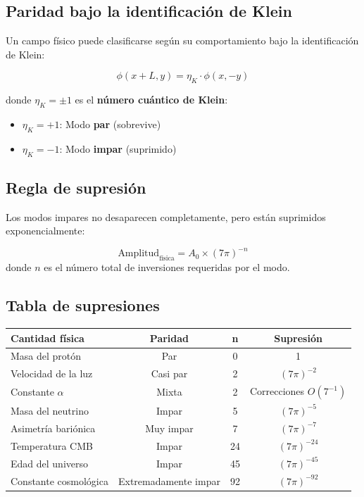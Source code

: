 \documentclass[12pt,a4paper,openany]{book}
\begin{document}
\begin{nivelconceptual}

\section*{Paridad bajo la identificación de Klein}

Un campo físico puede clasificarse según su comportamiento bajo la identificación de Klein:

\begin{equation}
    \phi(x + L, y) = \eta_K \cdot \phi(x, -y)
\end{equation}

donde $\eta_K = \pm 1$ es el \textbf{número cuántico de Klein}:
\begin{itemize}
    \item $\eta_K = +1$: Modo \textbf{par} (sobrevive)
    \item $\eta_K = -1$: Modo \textbf{impar} (suprimido)
\end{itemize}

\subsection*{Regla de supresión}

Los modos impares no desaparecen completamente, pero están suprimidos exponencialmente:

\begin{formulabox}
\begin{equation}
    \text{Amplitud}_{\text{física}} = A_0 \times (7\pi)^{-n}
\end{equation}
donde $n$ es el número total de inversiones requeridas por el modo.
\end{formulabox}

\subsection*{Tabla de supresiones}

\begin{table}[H]
\centering
\begin{tabular}{lccc}
\toprule
\textbf{Cantidad física} & \textbf{Paridad} & \textbf{n} & \textbf{Supresión} \\
\midrule
Masa del protón & Par & 0 & 1 \\
Velocidad de la luz & Casi par & 2 & $(7\pi)^{-2}$ \\
Constante $\alpha$ & Mixta & 2 & Correcciones $O(7^{-1})$ \\
Masa del neutrino & Impar & 5 & $(7\pi)^{-5}$ \\
Asimetría bariónica & Muy impar & 7 & $(7\pi)^{-7}$ \\
Temperatura CMB & Impar & 24 & $(7\pi)^{-24}$ \\
Edad del universo & Impar & 45 & $(7\pi)^{-45}$ \\
Constante cosmológica & Extremadamente impar & 92 & $(7\pi)^{-92}$ \\
\bottomrule
\end{tabular}
\end{table}

\end{nivelconceptual}
\end{document}
